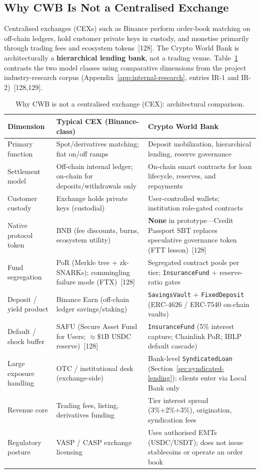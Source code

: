 \documentclass[12pt,a4paper]{report}
\newcommand{\tableheadcolor}{\rowcolor{TableHeadBg}}
\begin{document}
\subsection{Why CWB Is Not a Centralised Exchange}
\label{sec:not-a-cex}

Centralised exchanges (CEXs) such as Binance perform order-book matching on off-chain ledgers, hold customer private keys in custody, and monetise primarily through trading fees and ecosystem tokens~[128]. The Crypto World Bank is architecturally a \textbf{hierarchical lending bank}, not a trading venue. Table~\ref{tab:cex-vs-cwb} contrasts the two model classes using comparative dimensions from the project industry-research corpus (Appendix~\ref{app:internal-research}, entries IR-1 and IR-2)~[128,129].

\begin{table}[H]
\centering
\caption[Why CWB is not a CEX]{Why CWB is not a centralised exchange (CEX): architectural comparison.}
\label{tab:cex-vs-cwb}
\begin{tabular}{p{3.2cm}p{5.2cm}p{5.2cm}}
\toprule
\tableheadcolor
\textbf{Dimension} & \textbf{Typical CEX (Binance-class)} & \textbf{Crypto World Bank} \\
\midrule
Primary function & Spot/derivatives matching; fiat on/off ramps & Deposit mobilization, hierarchical lending, reserve governance \\
Settlement model & Off-chain internal ledger; on-chain for deposits/withdrawals only & On-chain smart contracts for loan lifecycle, reserves, and repayments \\
Customer custody & Exchange holds private keys (custodial) & User-controlled wallets; institution role-gated contracts \\
Native protocol token & BNB (fee discounts, burns, ecosystem utility) & \textbf{None} in prototype---Credit Passport SBT replaces speculative governance token (FTT lesson)~[128] \\
Fund segregation & PoR (Merkle tree + zk-SNARKs); commingling failure mode (FTX)~[128] & Segregated contract pools per tier; \texttt{InsuranceFund} + reserve-ratio gates \\
Deposit / yield product & Binance Earn (off-chain ledger savings/staking) & \texttt{SavingsVault} + \texttt{FixedDeposit} (ERC-4626 / ERC-7540 on-chain vaults) \\
Default / shock buffer & SAFU (Secure Asset Fund for Users; $\approx$\$1B USDC reserve)~[128] & \texttt{InsuranceFund} (5\% interest capture; Chainlink PoR; IBLP default cascade) \\
Large exposure handling & OTC / institutional desk (exchange-side) & Bank-level \texttt{SyndicatedLoan} (Section~\ref{sec:syndicated-lending}); clients enter via Local Bank only \\
Revenue core & Trading fees, listing, derivatives funding & Tier interest spread (3\%+2\%+3\%), origination, syndication fees \\
Regulatory posture & VASP / CASP exchange licensing & Uses authorised EMTs (USDC/USDT); does not issue stablecoins or operate an order book \\
\bottomrule
\end{tabular}
\end{table}
\end{document}
